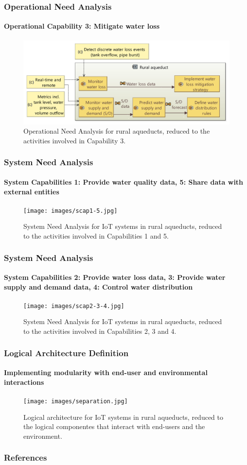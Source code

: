 \documentclass{beamer}
\begin{document}
\begin{frame}
    \frametitle{\small Operational Need Analysis}
    \framesubtitle{Operational Capability 3: Mitigate water loss}

    \begin{figure}
        \centering
        \includegraphics[width=\textwidth]{images/opcap3.jpg}
        \caption{Operational Need Analysis for rural aqueducts, reduced to the activities involved in Capability 3.}
    \end{figure}
\end{frame}

\begin{frame}
    \frametitle{\small System Need Analysis}
    \framesubtitle{System Capabilities 1: Provide water quality data, 5: Share data with external entities}

    \begin{figure}
        \centering
        \texttt{[image: images/scap1-5.jpg]}
        \caption{System Need Analysis for IoT systems in rural aqueducts, reduced to the activities involved in Capabilities 1 and 5.}
    \end{figure}
\end{frame}

\begin{frame}
    \frametitle{\small System Need Analysis}
    \framesubtitle{System Capabilities 2: Provide water loss data, 3: Provide water supply and demand data, 4: Control water distribution}

    \begin{figure}
        \centering
        \texttt{[image: images/scap2-3-4.jpg]}
        \caption{System Need Analysis for IoT systems in rural aqueducts, reduced to the activities involved in Capabilities 2, 3 and 4.}
    \end{figure}
\end{frame}

\begin{frame}
    \frametitle{\small Logical Architecture Definition}
    \framesubtitle{Implementing modularity with end-user and environmental interactions}

    \begin{figure}
        \centering
        \texttt{[image: images/separation.jpg]}
        \caption{Logical architecture for IoT systems in rural aqueducts, reduced to the logical componentes that interact with end-users and the environment.}
    \end{figure}
\end{frame}

\begin{frame}
    \frametitle{References}
    
    
\end{frame}
\end{document}
